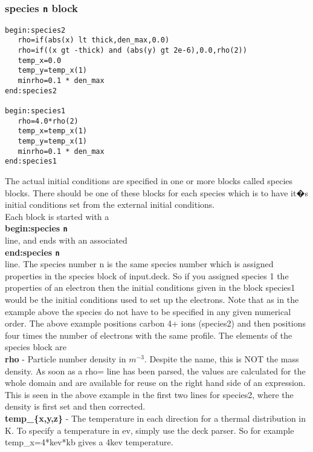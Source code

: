 \documentclass[12pt]{article}
\newcommand{\emphtext}{\color{warwickdark} \fontfamily{phv}\selectfont\Large\bf}
\newcommand{\inlineemph}{\color{warwicklight} \bf}
\newcommand{\boxverbatim}[1]{\begin{Verbatim}[obeytabs=true,frame=single,
  framerule=0.5mm,rulecolor=\color{warwickmid},label=#1]}
\newcommand{\inlinecode}[1]{{\color{warwickred} \bf\texttt{#1}}}
\begin{document}
\subsubsection{{\inlineemph species\inlinecode{n}} block}
\boxverbatim{species{\it n} block}
begin:species2
   rho=if(abs(x) lt thick,den_max,0.0)
   rho=if((x gt -thick) and (abs(y) gt 2e-6),0.0,rho(2))
   temp_x=0.0
   temp_y=temp_x(1)
   minrho=0.1 * den_max
end:species2

begin:species1
   rho=4.0*rho(2)
   temp_x=temp_x(1)
   temp_y=temp_x(1)
   minrho=0.1 * den_max
end:species1
\end{Verbatim}

The actual initial conditions are specified in one or more blocks called
species blocks. There should be one of these blocks for each species which is
to have it�s initial conditions set from the external initial conditions.\\

Each block is started with a\\

{\emphtext begin:species\inlinecode{n}}\\

line, and ends with an associated \\

{\emphtext end:species\inlinecode{n}}\\

line. The species number n is the same species number which is assigned
properties in the species block of input.deck. So if you assigned species 1 the
properties of an electron then the initial conditions given in the block
species1 would be the initial conditions used to set up the electrons. Note
that as in the example above the species do not have to be specified in any
given numerical order. The above example positions carbon 4+ ions (species2)
and then positions four times the number of electrons with the same
profile. The elements of the species block are\\

{\emphtext rho} - Particle number density in $m^{-3}$. Despite the name, this
is NOT the mass density. As soon as a rho= line has been parsed, the values are
calculated for the whole domain and are available for reuse on the right hand
side of an expression. This is seen in the above example in the first two lines
for species2, where the density is first set and then corrected.\\

{\emphtext temp\_\{x,y,z\}} - The temperature in each direction for a thermal
distribution in K. To specify a temperature in ev, simply use the deck
parser. So for example temp\_x=4*kev*kb gives a 4kev temperature.\\
\end{document}
